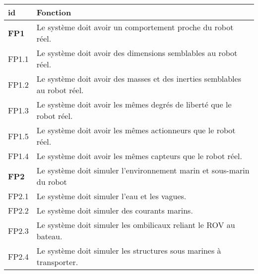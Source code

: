         \begin{table}[!htb]
            \centering
            \begin{adjustbox}{max width=\textwidth}
                \begin{tabularx}{\textwidth}{|lX|}
                    \hline
                    \cellcolor{gray!25}\textbf{id} & \cellcolor{gray!25} \textbf{Fonction} \\
                    \hline \hline
                    \cellcolor{blue!30}\textbf{FP1}&\cellcolor{blue!25} Le système doit avoir un comportement proche du robot réel. \\
                    \hline
                    \cellcolor{gray!10}FP1.1& Le système doit avoir des dimensions semblables au robot réel. \\
                    \hline
                    \cellcolor{gray!10}FP1.2& Le système doit avoir des masses et des inerties semblables au robot réel. \\
                    \hline
                    \cellcolor{gray!10}FP1.3& Le système doit avoir les mêmes degrés de liberté que le robot réel. \\
                    \hline
                    \cellcolor{gray!10}FP1.5& Le système doit avoir les mêmes actionneurs que le robot réel. \\
                    \hline
                    \cellcolor{gray!10}FP1.4& Le système doit avoir les mêmes capteurs que le robot réel. \\
            
                    \hline \hline
            
                    \cellcolor{blue!30}\textbf{FP2}&\cellcolor{blue!25} Le système doit simuler l'environnement marin et sous-marin du robot \\
                    \hline
                    \cellcolor{gray!10}FP2.1& Le système doit simuler l'eau et les vagues. \\
                    \hline
                    \cellcolor{gray!10}FP2.2& Le système doit simuler des courants marins. \\
                    \hline
                    \cellcolor{gray!10}FP2.3& Le système doit simuler les ombilicaux reliant le \gls{ROV} au bateau. \\
                    \hline
                    \cellcolor{gray!10}FP2.4& Le système doit simuler les structures sous marines à transporter. \\
                    \hline
            

\end{tabularx}
\end{adjustbox}
\end{table}

